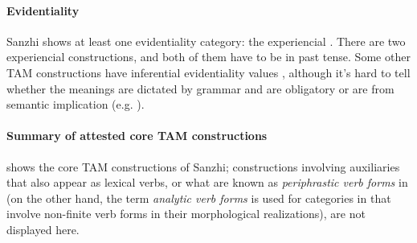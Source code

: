 \documentclass[a4paper, oneside, 12pt]{report}
\newcommand*{\citesec}[1]{\S~{#1}}
\newcommand*{\citepage}[1]{p.~{#1}}
\newcommand*{\citepages}[1]{pp.~{#1}}
\newcommand*{\term}[1]{\emph{#1}}
\begin{document}
\paragraph*{Evidentiality} 
Sanzhi shows at least one evidentiality category: the experiencial \citep[\citesec{14.2.6}]{forker2020grammar}.
There are two experiencial constructions, and both of them have to be in past tense. 
Some other TAM constructions have inferential evidentiality values
\citep[\citepages{262,254-266}]{forker2020grammar}, 
although it's hard to tell whether the meanings are dictated by grammar and are obligatory 
or are from semantic implication (e.g. \citealt[\citepage{262}, (58)]{forker2020grammar}).

\paragraph*{Summary of attested core TAM constructions}
 shows the core TAM constructions of Sanzhi;
constructions involving auxiliaries that also appear as lexical verbs, 
or what are known as \term{periphrastic verb forms} in \cite{forker2020grammar}
(on the other hand, the term \term{analytic verb forms}
is used for categories in  
that involve non-finite verb forms in their morphological realizations),
are not displayed here.
\end{document}
